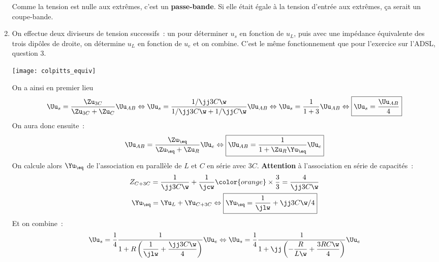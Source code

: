 \documentclass[a4paper, 12pt, final, garamond]{book}
\begin{document}
\begin{enumerate}
        Comme la tension est nulle aux extrêmes, c'est un \textbf{passe-bande}.
        Si elle était égale à la tension d'entrée aux extrêmes, ça serait un
        coupe-bande.
    \item On effectue deux diviseurs de tension successifs~: un pour déterminer
        $u_s$ en fonction de $u_L$, puis avec une impédance équivalente des
        trois dipôles de droite, on détermine $u_L$ en fonction de $u_e$ et on
        combine. C'est le même fonctionnement que pour l'exercice sur l'ADSL,
        question 3.
        \begin{center}
            \texttt{[image: colpitts\_equiv]}
        \end{center}
        On a ainsi en premier lieu
        \begin{gather*}
            \Uu_s = \frac{\Zu_{3C}}{\Zu_{3C} + \Zu_C}\Uu_{AB}
            \Leftrightarrow
            \Uu_s = \frac{1/\jj3C\w}{1/\jj3C\w + 1/\jj C\w}\Uu_{AB}
            \Leftrightarrow
            \Uu_s = \frac{1}{1+3}\Uu_{AB}
            \Leftrightarrow
            \boxed{\Uu_s = \frac{\Uu_{AB}}{4}}
        \end{gather*}
        On aura donc ensuite~:
        \begin{gather*}
            \Uu_{AB} = \frac{\Zu_{\eq}}{\Zu_{\eq} + \Zu_R}\Uu_e
            \Leftrightarrow
            \boxed{\Uu_{AB} = \frac{1}{1+\Zu_R\Yu_{\eq}}\Uu_e}
        \end{gather*}
        On calcule alors $\Yu_{\eq}$ de l'association en parallèle de $L$ et
        $C$ en série avec $3C$. \textbf{Attention} à l'association en série de
        capacités~:
        \begin{gather*}
            Z_{C+3C} = \frac{1}{\jj3C\w} + \frac{1}{\jcw}{\color{orange}\times 
                \frac{3}{3}} = \frac{4}{\jj3C\w}\\
            \Yu_{\eq} = \Yu_L + \Yu_{C+3C}
            \Leftrightarrow
            \boxed{\Yu_{\eq} = \frac{1}{\jlw} + \jj3C\w/4}
        \end{gather*}
        Et on combine~:
        \begin{gather*}
            \Uu_s =
                \frac{1}{4}
                \frac{1}{1+R \left( \dfrac{1}{\jlw} + \dfrac{\jj3C\w}{4} \right)}
                \Uu_e
            \Leftrightarrow
            \Uu_s =
                \frac{1}{4}
                \frac{1}{1+\jj \left( - \dfrac{R}{L\w} + \dfrac{3RC\w}{4} \right)}
                \Uu_e
                \\

\end{gather*}
\end{enumerate}
\end{document}
